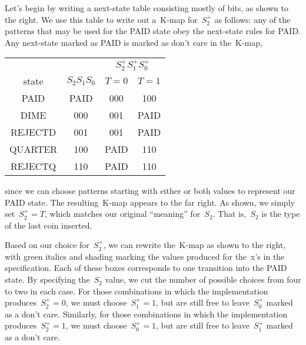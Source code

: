 \begin{minipage}{2.4in}
Let's begin by writing a next-state table consisting mostly of bits,
as shown to the right.  We use this table to write out a~\mbox{K-map}
for~$S_2^+$ as follows: any of the patterns that may be used for the
PAID state obey the next-state rules for PAID.  Any next-state marked
as PAID is marked as don't care in the~\mbox{K-map},\linebreak
\end{minipage}\hspace{0.25in}%
\begin{minipage}{2.55in}
\begin{tabular}{cc|cc}
&&\multicolumn{2}{|c}{$S_2^+S_1^+S_0^+$}\\
state& $S_2S_1S_0$& $T=0$& $T=1$\\ \hline
PAID& PAID& 000& 100\\
DIME& 000& 001& PAID\\
REJECTD& 001& 001& PAID\\
QUARTER& 100& PAID& 110\\
REJECTQ& 110& PAID& 110\\
\end{tabular}\vspace{12pt}
\end{minipage}\hspace{0.25in}%
\begin{minipage}{1.05in}
\end{minipage}\mpdone

since we can
choose patterns starting with either or both values to represent our
PAID state.  The resulting~\mbox{K-map} appears to the far right.
As shown, we simply set~$S_2^+=T$, which matches our
original ``meaning'' for~$S_2$.  That is,~$S_2$ is the type of the
last coin inserted.

\begin{minipage}{5.2in}
Based on our choice for~$S_2^+$, we can rewrite the~\mbox{K-map} as
shown to the right, with green italics and shading marking the
values produced for the~x's in the specification.  Each of these
boxes corresponds to one transition into the PAID state.  By 
specifying the~$S_2$ value, we cut the number of possible choices
from four to two in each case.  For those combinations in which the
implementation produces~$S_2^+=0$, we must choose~$S_1^+=1$, but
are still free to leave~$S_0^+$ marked as a don't care.  Similarly,
for those combinations in which the implementation produces~$S_2^+=1$, 
we must choose~$S_0^+=1$, but
are still free to leave~$S_1^+$ marked as a don't care.
\end{minipage}\hspace{0.25in}%
\begin{minipage}{1.05in}
\end{minipage}

